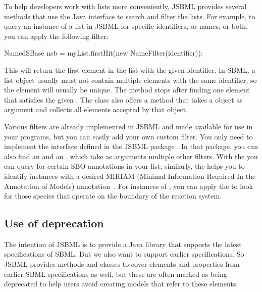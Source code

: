 To help developers work with  lists more conveniently, JSBML
provides several methods that use the Java  interface to search
and filter the lists. For example, to query an instance of a 
list in JSBML for specific identifiers, or names, or both, you can apply the
following filter:

\begin{example}[title={Example of searching a list for an object with a
    particular identifier.}]
NamedSBase nsb = myList.firstHit(new NameFilter(identifier));
\end{example}

This will return the first element in the list with the given identifier.  In
SBML, a  list object usually must not contain multiple elements
with the same identifier, so the element will usually be unique.  The
 method stops after finding one element that satisfies the
given . The  class also offers a
 method that takes a  object as argument and
collects all elements accepted by that  object.

Various filters are already implemented in JSBML and made available for use
in your programs, but you can easily add your own custom filter. You only
need to implement the \Filter interface defined in the JSBML package
.  In that package, you can also find an
\OrFilter and an \AndFilter, which take as arguments multiple other
filters. With the \SBOFilter you can query for certain SBO annotations
\citep{Novere2006, Novere2006b} %
in your list; similarly, the \CVTermFilter helps you to identify \SBase
instances with a desired MIRIAM (Minimal Information Required In the
Annotation of Models) annotation~\citep{Novere2005}. For
instances of , you can apply the
\BoundaryConditionFilter to look for those species that operate on the boundary of the reaction system.


\subsection{Use of deprecation}

The intention of JSBML is to provide a Java
library that supports the latest specifications of SBML.
%
%
But we also want to support earlier specifications. So JSBML provides
methods and classes to cover elements and properties from earlier SBML
specifications as well, but these are often marked as being deprecated to
help users avoid creating models that refer to these elements. 

